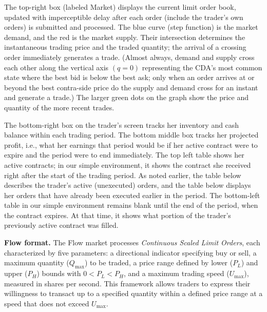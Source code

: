 \documentclass[12pt]{article}
\begin{document}
The top-right box (labeled Market) displays the current limit order book, updated with imperceptible delay after each order 
(include the trader's own orders) is submitted and processed. 
The blue curve (step function) 
is the market demand, and the red is the market supply. Their intersection determines the instantaneous trading price and the traded quantity;
the arrival of a crossing order immediately generates a trade.
(Almost always, demand and supply cross each other along the vertical axis $(q=0)$ representing the CDA's most common state where the best bid is below the best ask; only when an order arrives at or beyond the best contra-side price do the supply and demand cross for an instant and generate a trade.) 
The larger green dots on the graph show the price and quantity of the more recent trades.

The bottom-right box on the trader's screen tracks her inventory and cash balance within each trading period. 
The bottom middle box tracks her projected profit, i.e., what her earnings that period would be if her active contract were to expire and the period were to end immediately. 
The top left table shows her active contracts; in our simple environment, it shows the contract she received right after the start of the trading period. 
As noted earlier, the table below describes the trader's active (unexecuted) orders, and 
the table below displays her orders that have already been executed earlier in the period. 
The bottom-left table in our simple environment remains blank until the end of the period, when the contract expires. At that time, it shows what portion of the trader's previously active contract was filled. 

\bigskip
\noindent
\textbf{Flow format.}
The Flow market processes  \textit{Continuous Scaled Limit Orders}, %
each characterized by five parameters: a directional indicator specifying buy or sell, a maximum quantity (\(Q_{\max}\)) to be traded, a price range defined by lower (\(P_L\)) and upper (\(P_H\)) bounds with \(0<P_L < P_H\), and a maximum trading speed (\(U_{\max}\)), measured in shares per second. This framework allows traders to express their willingness to transact up to a specified quantity within a defined price range at a speed that does not exceed \(U_{\max}\).
\end{document}
